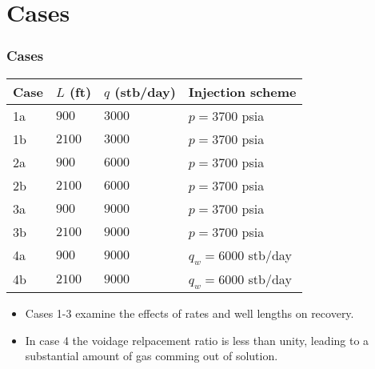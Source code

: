 
\section{Cases}
\begin{frame}
    \frametitle{Cases}
    \begin{center}
        \begin{tabular}{llll}
            \toprule
            \textbf{Case} & \textbf{$L$ (ft)} & \textbf{$q$ (stb/day)} & \textbf{Injection scheme} \\
            \midrule
            1a            & $900$             & $3000$                 & $p = 3700$ psia           \\
            1b            & $2100$            & $3000$                 & $p = 3700$ psia           \\
            2a            & $900$             & $6000$                 & $p = 3700$ psia           \\
            2b            & $2100$            & $6000$                 & $p = 3700$ psia           \\
            3a            & $900$             & $9000$                 & $p = 3700$ psia           \\
            3b            & $2100$            & $9000$                 & $p = 3700$ psia           \\
            4a            & $900$             & $9000$                 & $q_w = 6000$ stb/day      \\
            4b            & $2100$            & $9000$                 & $q_w = 6000$ stb/day      \\
            \bottomrule
        \end{tabular}
    \end{center}

    \pause
    \begin{itemize}
        \item Cases 1-3 examine the effects of rates and well lengths on recovery.
        \pause
        \item In case 4 the voidage relpacement ratio is less than unity, leading to a substantial amount of gas comming out of solution.
    \end{itemize}
\end{frame}